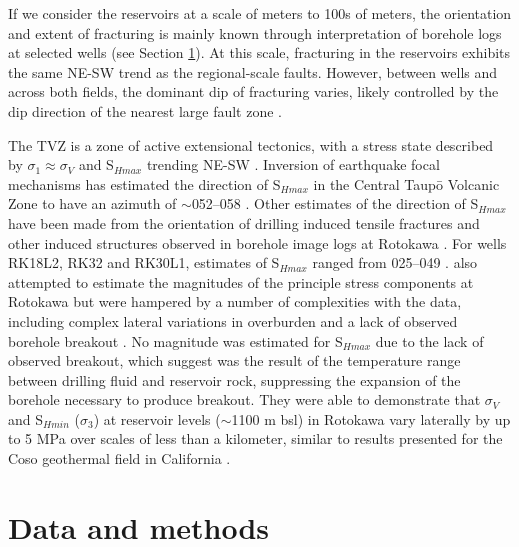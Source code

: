 If we consider the reservoirs at a scale of meters to 100s of meters, the orientation and extent of fracturing is mainly known through interpretation of borehole logs at selected wells (see Section \ref{data-methods}). At this scale, fracturing in the reservoirs exhibits the same NE-SW trend as the regional-scale faults. However, between wells and across both fields, the dominant dip of fracturing varies, likely controlled by the dip direction of the nearest large fault zone \citep{McNamara_2015}.

The TVZ is a zone of active extensional tectonics, with a stress state described by $\sigma_{1}\approx{\sigma_{V}}$ and S$_{Hmax}$ trending NE-SW \citep{Townend_2012}. Inversion of earthquake focal mechanisms has estimated the direction of S$_{Hmax}$ in the Central Taup\={o} Volcanic Zone to have an azimuth of $\sim$052--058\textdegree{} \citep{hurst2002earthquake,hurst2008characteristics}. Other estimates of the direction of S$_{Hmax}$ have been made from the orientation of drilling induced tensile fractures and other induced structures observed in borehole image logs at Rotokawa \citep{McNamara_2015}. For wells RK18L2, RK32 and RK30L1, estimates of S$_{Hmax}$ ranged from 025--049\textdegree{} \citep{McNamara_2015}. \citet{davidson_2012} also attempted to estimate the magnitudes of the principle stress components at Rotokawa but were hampered by a number of complexities with the data, including complex lateral variations in overburden and a lack of observed borehole breakout \citep{McNamara_2015}. No magnitude was estimated for S$_{Hmax}$ due to the lack of observed breakout, which \citet{davidson_2012} suggest was the result of the temperature range between drilling fluid and reservoir rock, suppressing the expansion of the borehole necessary to produce breakout. They were able to demonstrate that $\sigma_{V}$ and S$_{Hmin}$ ($\sigma_{3}$) at reservoir levels ($\sim$1100 m bsl) in Rotokawa vary laterally by up to 5 MPa over scales of less than a kilometer, similar to results presented for the Coso geothermal field in California \citep[e.g.][]{davidson_2012,blake2011crustal}.

\section{Data and methods}\label{data-methods}
